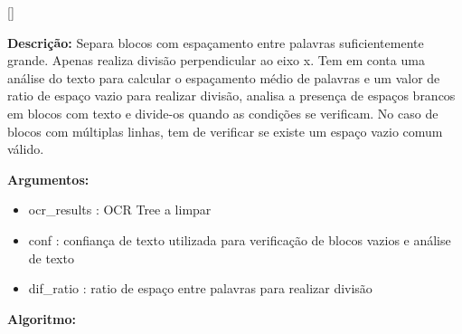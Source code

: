 [\normalsize]

\textbf{Descrição:} Separa blocos com espaçamento entre palavras suficientemente grande. Apenas realiza divisão perpendicular ao eixo x. Tem em conta uma análise do texto para calcular o espaçamento médio de palavras e um valor de ratio de espaço vazio para realizar divisão, analisa a presença de espaços brancos em blocos com texto e divide-os quando as condições se verificam. No caso de blocos com múltiplas linhas, tem de verificar se existe um espaço vazio comum válido.

\textbf{Argumentos:}
\begin{itemize}\setlength\itemsep{-0.3em}
	\item ocr\_results : OCR Tree a limpar
	\item conf : confiança de texto utilizada para verificação de blocos vazios e análise de texto
	\item dif\_ratio : ratio de espaço entre palavras para realizar divisão
\end{itemize}

\textbf{Algoritmo:}


